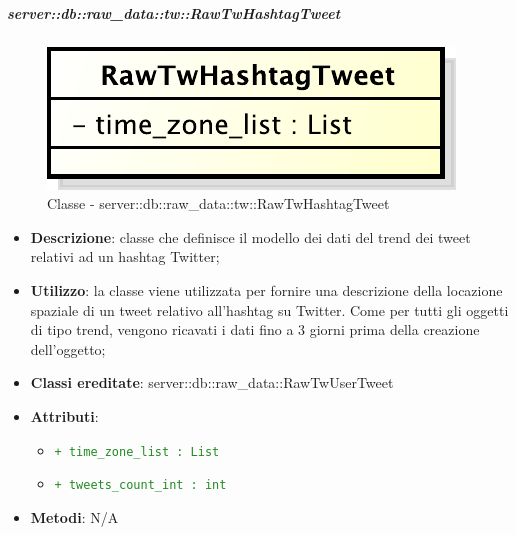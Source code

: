 		\subparagraph{server::db::raw\_data::tw::RawTwHashtagTweet} %
		\label{subp:server_db_raw_data_tw_rawtwhashtagtweet}
			\begin{figure}[htbp]
				\centering
				\centerline{\includegraphics[scale=0.75]{./images/server/classes/db/raw_tw_hashtag_tweet.pdf}}
				\caption{Classe - server::db::raw\_data::tw::RawTwHashtagTweet}
			\end{figure}
			\begin{itemize}
				\item \textbf{Descrizione}: classe che definisce il modello dei dati del trend dei tweet relativi ad un hashtag Twitter;
				\item \textbf{Utilizzo}: la classe viene utilizzata per fornire una descrizione della locazione spaziale di un tweet relativo all'hashtag su Twitter. Come per tutti gli oggetti di tipo trend, vengono ricavati i dati fino a 3 giorni prima della creazione dell'oggetto;
				\item \textbf{Classi ereditate}: server::db::raw\_data::RawTwUserTweet
				\item \textbf{Attributi}:
					\begin{itemize}
						\item \textcolor{forestgreen}{\texttt{+ time\_zone\_list : List}}
						\item \textcolor{forestgreen}{\texttt{+ tweets\_count\_int : int}}
					\end{itemize}
				\item \textbf{Metodi}: N/A
			\end{itemize}


